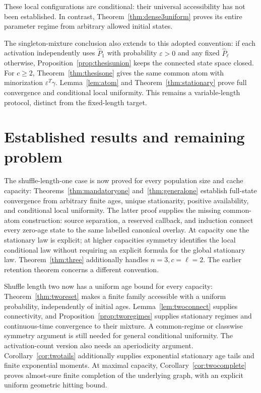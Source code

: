 \documentclass[11pt]{article}
\begin{document}
These local configurations are conditional: their universal
accessibility has not been established. In contrast,
Theorem~\ref{thm:dense3uniform} proves its entire parameter
regime from arbitrary allowed initial states.

The singleton-mixture conclusion also extends to this adopted
convention: if each activation independently uses
$\widehat P_1$ with probability $\varepsilon>0$ and any
fixed $\widehat P_\ell$ otherwise, Proposition~\ref{prop:thesisunion}
keeps the connected state space closed. For $c\ge2$,
Theorem~\ref{thm:thesisone} gives the same common atom
with minorization $\varepsilon^T\gamma$.
Lemma~\ref{lem:atom} and Theorem~\ref{thm:stationary}
prove full convergence and conditional local uniformity.
This remains a variable-length protocol, distinct from the
fixed-length target.

\section{Established results and remaining problem}

The shuffle-length-one case is now proved for every population
size and cache capacity: Theorems~\ref{thm:mandatoryone}
and~\ref{thm:generalone} establish full-state convergence from
arbitrary finite ages, unique stationarity, positive availability,
and conditional local uniformity.
The latter proof supplies the missing common-atom construction:
source separation, a reserved callback, and induction connect
every zero-age state to the same labelled canonical overlay.
At capacity one the stationary law is explicit; at higher
capacities symmetry identifies the local conditional law without
requiring an explicit formula for the global stationary law.
Theorem~\ref{thm:three} additionally handles $n=3,c=\ell=2$.
The earlier retention theorem concerns a different convention.

Shuffle length two now has a uniform age bound for every
capacity: Theorem~\ref{thm:tworeset} makes a finite family
accessible with a uniform probability, independently of initial
ages. Lemma~\ref{lem:twoconnect} supplies connectivity, and
Proposition~\ref{prop:tworegimes} supplies stationary regimes
and continuous-time convergence to their mixture.
A common-regime or classwise symmetry argument is still needed
for general conditional uniformity. The activation-count version
also needs an aperiodicity argument.
Corollary~\ref{cor:twotails} additionally supplies exponential
stationary age tails and finite exponential moments.
At maximal capacity, Corollary~\ref{cor:twocomplete} proves
almost-sure finite completion of the underlying graph, with
an explicit uniform geometric hitting bound.
\end{document}
